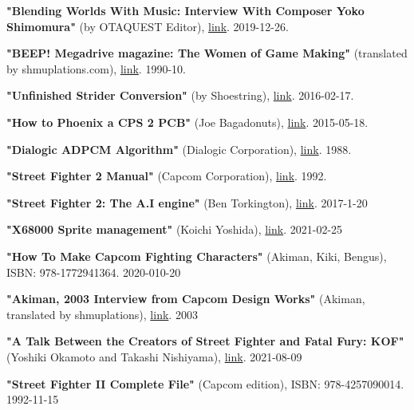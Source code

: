 \begin{thebibliography}{999}
  \textbf{"Blending Worlds With Music: Interview With Composer Yoko Shimomura"} (by OTAQUEST Editor),
  \href{https://www.otaquest.com/yoko-shimomura-interview/}{link}.
  2019-12-26.
  
  \textbf{"BEEP! Megadrive magazine: The Women of Game Making"} (translated by shmuplations.com),
  \href{https://shmuplations.com/womenofgamedesign/}{link}.
  1990-10.

  \textbf{"Unfinished Strider Conversion"} (by Shoestring),
  \href{https://www.jammarcade.net/strider-conversion/}{link}.
  2016-02-17.

  \textbf{"How to Phoenix a CPS 2 PCB"} (Joe Bagadonuts),
  \href{https://www.youtube.com/watch?v=HFj8Mkw_kog}{link}.
  2015-05-18.

  \textbf{"Dialogic ADPCM Algorithm"} (Dialogic Corporation),
  \href{https://multimedia.cx/mirror/dialogic-adpcm.pdf}{link}.
  1988.



  \textbf{"Street Fighter 2 Manual"} (Capcom Corporation),
  \href{https://www.gamesdatabase.org/Media/SYSTEM/Arcade/Manual/formated/Street_Fighter_II--_Champion_Edition_-_1992_-_Capcom.pdf}{link}.
  1992.

  \textbf{"Street Fighter 2: The A.I engine"} (Ben Torkington),
  \href{https://sf2platinum.wordpress.com/2017/01/20/the-ai-engine}{link}.
  2017-1-20

  \textbf{"X68000 Sprite management"} (Koichi Yoshida),
  \href{https://yosshin4004-github-io.translate.goog/x68k/xsp/index.html?_x_tr_sl=ja&_x_tr_tl=en&_x_tr_hl=en-US}{link}.
  2021-02-25

  \textbf{"How To Make Capcom Fighting Characters"} (Akiman, Kiki, Bengus),
  ISBN: 978-1772941364.
  2020-010-20

  \textbf{"Akiman, 2003 Interview from Capcom Design Works"} (Akiman, translated by shmuplations),
  \href{http://shmuplations.com/akirayasuda/}{link}.
  2003

  \textbf{"A Talk Between the Creators of Street Fighter and Fatal Fury: KOF"} (Yoshiki Okamoto and Takashi Nishiyama),
  \href{https://www.youtube.com/watch?v=uqRFod7nuHo&t}{link}.
  2021-08-09

  \textbf{"Street Fighter II Complete File"} (Capcom edition),
  ISBN: 978-4257090014.
  1992-11-15


\end{thebibliography}
